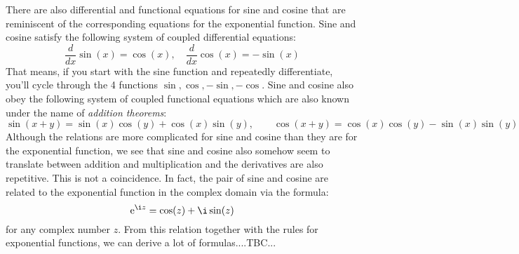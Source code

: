 There are also differential and functional equations for sine and cosine that are reminiscent of the corresponding equations for the exponential function. Sine and cosine satisfy the following system of coupled differential equations:
\begin{equation}
\frac{d}{dx} \sin(x) = \cos(x), \quad
\frac{d}{dx} \cos(x) = -\sin(x)
\end{equation}
That means, if you start with the sine function and repeatedly differentiate, you'll cycle through the 4 functions $\sin, \cos, -\sin, -\cos$. Sine and cosine also obey the following system of coupled functional equations which are also known under the name of \emph{addition theorems}:
\begin{equation}
\sin(x+y) = \sin(x) \cos(y) + \cos(x) \sin(y), \qquad
\cos(x+y) = \cos(x) \cos(y) - \sin(x) \sin(y)
\end{equation}
Although the relations are more complicated for sine and cosine than they are for the exponential function, we see that sine and cosine also somehow seem to translate between addition and multiplication and the derivatives are also repetitive. This is not a coincidence. In fact, the pair of sine and cosine are related to the exponential function in the complex domain via the formula:
\begin{equation}
\e^{\i z} = \cos(z) + \i \sin(z)
\end{equation}
for any complex number $z$. From this relation together with the rules for exponential functions, we can derive a lot of formulas....TBC...















